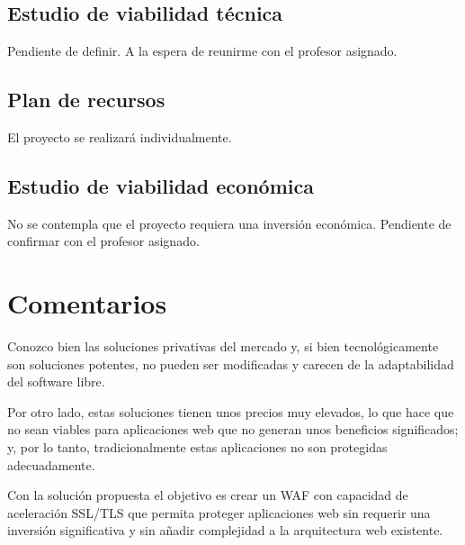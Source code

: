 \subsection{Estudio de viabilidad técnica}
\par Pendiente de definir. A la espera de reunirme con el profesor asignado.

\subsection{Plan de recursos}
\par El proyecto se realizará individualmente.

\subsection{Estudio de viabilidad económica}
\par No se contempla que el proyecto requiera una inversión económica. Pendiente de confirmar con el profesor asignado.

\section{Comentarios}

\par Conozco bien las soluciones privativas del mercado y, si bien tecnológicamente son soluciones potentes, no
pueden ser modificadas y carecen de la adaptabilidad del software libre.
\par Por otro lado, estas soluciones tienen unos precios muy elevados, lo que hace que no sean viables para
aplicaciones web que no generan unos beneficios significados; y, por lo tanto, tradicionalmente estas aplicaciones no
son protegidas adecuadamente.
\par Con la solución propuesta el objetivo es crear un WAF con capacidad de aceleración SSL/TLS que permita proteger
aplicaciones web sin requerir una inversión significativa y sin añadir complejidad a la arquitectura web existente.

